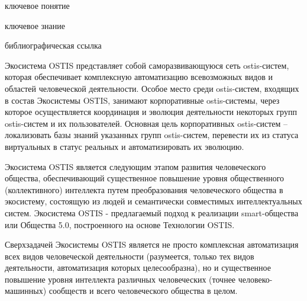 \begin{SCn}

\bigskip

\begin{scnrelfromlist}{ключевое понятие}
\end{scnrelfromlist}

\bigskip

\begin{scnrelfromlist}{ключевое знание}
\end{scnrelfromlist}

\bigskip

\begin{scnrelfromlist}{библиографическая ссылка}
\end{scnrelfromlist}

\end{SCn}

Экосистема OSTIS представляет собой саморазвивающуюся сеть ostis-систем, которая обеспечивает комплексную автоматизацию всевозможных видов и областей человеческой деятельности. 
Особое место среди ostis-систем, входящих в состав Экосистемы OSTIS, занимают корпоративные ostis-системы, через которое осуществляется координация и эволюция деятельности некоторых групп ostis-систем и их пользователей. 
Основная цель корпоративных ostis-систем – локализовать базы знаний указанных групп ostis-систем, перевести их из статуса виртуальных в статус реальных и автоматизировать их эволюцию.

Экосистема OSTIS является следующим этапом развития человеческого общества, обеспечивающий существенное повышение уровня общественного (коллективного) интеллекта путем преобразования человеческого общества в экосистему, состоящую из людей и семантически совместимых интеллектуальных систем. 
Экосистема OSTIS - предлагаемый подход к реализации smart-общества или Общества 5.0, построенного на основе Технологии OSTIS.

Сверхзадачей Экосистемы OSTIS является не просто комплексная автоматизация всех видов человеческой деятельности (разумеется, только тех видов деятельности, автоматизация которых целесообразна), но и существенное повышение уровня интеллекта различных человеческих (точнее человеко-машинных) сообществ и всего человеческого общества в целом.